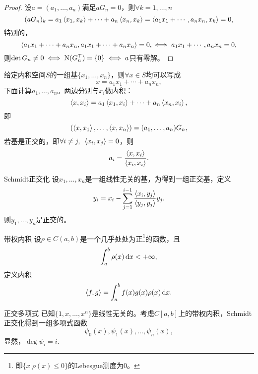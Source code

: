 \begin{proof}
    设$a=(a_1,\ldots,a_n)$满足$aG_n=0$，则$\forall k=1,\ldots,n$
    \[
        (aG_n)_k=a_1\left\langle x_1,x_k\right\rangle+\cdots+a_n\left\langle x_n,x_k\right\rangle=\left\langle a_1x_1+\cdots,a_nx_n,x_k\right\rangle=0,
    \]
    特别的，
    \[
        \left\langle a_1x_1+\cdots+a_nx_n,a_1x_1+\cdots+a_nx_n\right\rangle=0,\iff a_1x_1+\cdots,a_nx_n=0,
    \]
    则$\det G_n\neq 0\iff \mathrm N(G_n^\top)=\{0\}\iff a$只有零解。
\end{proof}

\begin{example}
    {}{}
    给定内积空间$S$的一组基$\{x_1,\ldots,x_n\}$，则$\forall x\in S$均可以写成
    \[
        x=a_1x_1+\cdots+a_nx_n,
    \]
    下面计算$a_1,\ldots,a_n$。两边分别与$x_i$做内积：
    \[
        \left\langle x,x_i\right\rangle=a_1\left\langle x_1,x_i\right\rangle+\cdots+a_n\left\langle x_n,x_i\right\rangle,
    \]
    即
    \[
        (\left\langle x,x_1\right\rangle,\ldots,\left\langle x,x_n\right\rangle)=(a_1,\ldots,a_n)G_n,
    \]
    若基是正交的，即$\forall i\neq j,\enspace\left\langle x_i,x_j\right\rangle=0$，则 
    \[
        a_i=\frac{\left\langle x,x_i\right\rangle}{\left\langle x_i,x_i\right\rangle}.
    \]
\end{example}

\begin{theorem}
    {Schmidt正交化}{}
    设$x_1,\ldots,x_n$是一组线性无关的基，为得到一组正交基，定义
    \begin{equation}
        y_i=x_i-\sum_{j=1}^{i-1}\frac{\left\langle x_i,y_j\right\rangle}{\left\langle y_j,y_j\right\rangle}y_j.
    \end{equation}
    则$y_1,\ldots,y_n$是正交的。
\end{theorem}

\begin{definition}
    {带权内积}{}
    设$\rho\in C(a,b)$是一个几乎处处为正\footnote{即$\{x|\rho(x)\leq 0\}$的Lebesgue测度为0。}的函数，且
    \[
        \int_a^b\rho(x)\mathop{}\!\mathrm{d} x<+\infty,
    \]
    定义内积
    \begin{equation}
        \left\langle f,g\right\rangle=\int_a^bf(x)g(x)\rho(x)\mathop{}\!\mathrm{d} x.
    \end{equation}
\end{definition}

\begin{definition}
    {正交多项式}{}
    已知$\{1,x,\ldots,x^n\}$是线性无关的。考虑$C[a,b]$上的带权内积，Schmidt正交化得到一组多项式函数
    \[
        \psi_0(x),\psi_1(x),\ldots,\psi_n(x),
    \]
    显然，$\deg\psi_i=i.$
\end{definition}

